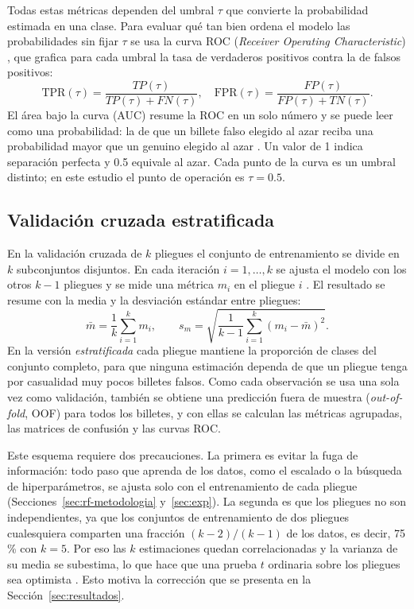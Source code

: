 \documentclass[conference]{IEEEtran}
\begin{document}
    Todas estas métricas dependen del umbral $\tau$ que convierte la probabilidad estimada en una clase. Para evaluar qué tan bien ordena el modelo las probabilidades sin fijar $\tau$ se usa la curva ROC (\textit{Receiver Operating Characteristic}) \cite{fawcett2006roc}, que grafica para cada umbral la tasa de verdaderos positivos contra la de falsos positivos:
    \begin{equation}
    	\text{TPR}(\tau)=\frac{TP(\tau)}{TP(\tau)+FN(\tau)},\quad
    	\text{FPR}(\tau)=\frac{FP(\tau)}{FP(\tau)+TN(\tau)}.
    	\label{eq:roc}
    \end{equation}
    El área bajo la curva (AUC) resume la ROC en un solo número y se puede leer como una probabilidad: la de que un billete falso elegido al azar reciba una probabilidad mayor que un genuino elegido al azar \cite{hanley1982auc}. Un valor de 1 indica separación perfecta y 0.5 equivale al azar. Cada punto de la curva es un umbral distinto; en este estudio el punto de operación es $\tau=0.5$.
    
    \subsection{Validación cruzada estratificada}
    \label{sec:cv}
    
    En la validación cruzada de $k$ pliegues el conjunto de entrenamiento se divide en $k$ subconjuntos disjuntos. En cada iteración $i=1,\dots,k$ se ajusta el modelo con los otros $k-1$ pliegues y se mide una métrica $m_i$ en el pliegue $i$ \cite{kohavi1995study}. El resultado se resume con la media y la desviación estándar entre pliegues:
    \begin{equation}
    	\bar{m}=\frac{1}{k}\sum_{i=1}^{k}m_i,\qquad
    	s_m=\sqrt{\frac{1}{k-1}\sum_{i=1}^{k}(m_i-\bar{m})^2}.
    	\label{eq:cv-resumen}
    \end{equation}
    En la versión \textit{estratificada} cada pliegue mantiene la proporción de clases del conjunto completo, para que ninguna estimación dependa de que un pliegue tenga por casualidad muy pocos billetes falsos. Como cada observación se usa una sola vez como validación, también se obtiene una predicción fuera de muestra (\textit{out-of-fold}, OOF) para todos los billetes, y con ellas se calculan las métricas agrupadas, las matrices de confusión y las curvas ROC.
    
    Este esquema requiere dos precauciones. La primera es evitar la fuga de información: todo paso que aprenda de los datos, como el escalado o la búsqueda de hiperparámetros, se ajusta solo con el entrenamiento de cada pliegue (Secciones~\ref{sec:rf-metodologia} y~\ref{sec:exp}). La segunda es que los pliegues no son independientes, ya que los conjuntos de entrenamiento de dos pliegues cualesquiera comparten una fracción $(k-2)/(k-1)$ de los datos, es decir, 75\,\% con $k=5$. Por eso las $k$ estimaciones quedan correlacionadas y la varianza de su media se subestima, lo que hace que una prueba $t$ ordinaria sobre los pliegues sea optimista \cite{nadeau2003inference}. Esto motiva la corrección que se presenta en la Sección~\ref{sec:resultados}.
 
\end{document}

